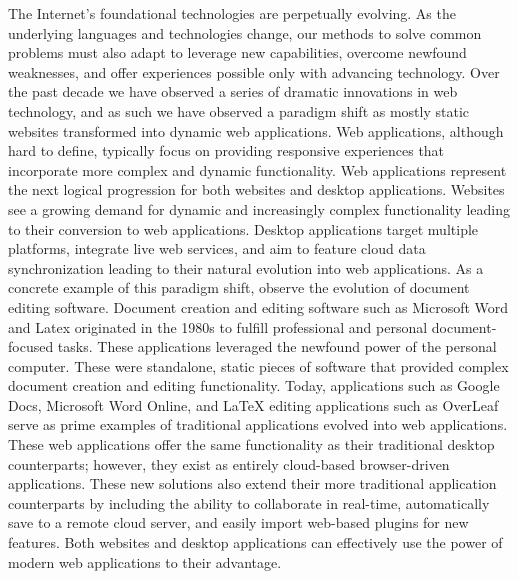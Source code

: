 %
%

The Internet’s foundational technologies are perpetually evolving.  As the underlying languages and technologies change, our methods to solve common problems must also adapt to leverage new capabilities, overcome newfound weaknesses, and offer experiences possible only with advancing technology. Over the past decade we have observed a series of dramatic innovations in web technology, and as such we have observed a paradigm shift as mostly static websites transformed into dynamic web applications.  Web applications, although hard to define, typically focus on providing responsive experiences that incorporate more complex and dynamic functionality.  Web applications represent the next logical progression for both websites and desktop applications.  Websites see a growing demand for dynamic and increasingly complex functionality leading to their conversion to web applications.  Desktop applications target multiple platforms, integrate live web services, and aim to feature cloud data synchronization leading to their natural evolution into web applications.  As a concrete example of this paradigm shift, observe the evolution of document editing software.  Document creation and editing software such as Microsoft Word and Latex originated in the 1980s to fulfill professional and personal document-focused tasks.  These applications leveraged the newfound power of the personal computer.  These were standalone, static pieces of software that provided complex document creation and editing functionality.  Today, applications such as Google Docs, Microsoft Word Online, and LaTeX editing applications such as OverLeaf serve as prime examples of traditional applications evolved into web applications. These web applications offer the same functionality as their traditional desktop counterparts; however, they exist as entirely cloud-based browser-driven applications.  These new solutions also extend their more traditional application counterparts by including the ability to collaborate in real-time, automatically save to a remote cloud server, and easily import web-based plugins for new features.  Both websites and desktop applications can effectively use the power of modern web applications to their advantage. \par
